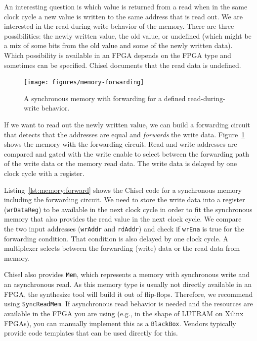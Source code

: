 \documentclass[%
    10pt,
    headinclude, footexclude,
    openright, %
    notitlepage,
    cleardoubleempty,
    headsepline,
    pointlessnumbers,
    bibtotoc, idxtotoc,
    ]{scrbook}
\newcommand{\code}[1]{{\lstinline[basicstyle=\small\ttfamily]{#1}}}
\begin{document}
An interesting question is which value is returned from a read when in the same clock
cycle a new value is written to the same address that is read out.
We are interested in the read-during-write behavior of the memory.
There are three possibilities: the newly written value, the old value, or undefined
(which might be a mix of some bits from the old value and some of the newly written data).
Which possibility is available in an FPGA depends on the FPGA type and
sometimes can be specified.
Chisel documents that the read data is undefined.

\begin{figure}
  \centering
  \texttt{[image: figures/memory-forwarding]}
  \caption{A synchronous memory with forwarding for a defined read-during-write behavior.}
  \label{fig:memory:forwarding}
\end{figure}

If we want to read out the newly written value, we can build a forwarding
circuit that detects that the addresses are equal and \emph{forwards} the
write data. Figure~\ref{fig:memory:forwarding} shows the memory with
the forwarding circuit. Read and write addresses are compared and gated with
the write enable to select between the forwarding path of the write data or the
memory read data. The write data is delayed by one clock cycle with a register.

Listing~\ref{lst:memory:forward} shows the Chisel code for a synchronous memory
including the forwarding circuit. We need to store the write data into a register
(\code{wrDataReg}) to be available in the next clock cycle in order to fit
the synchronous memory that also provides the read value in the next clock
cycle.
We compare the two input addresses (\code{wrAddr} and \code{rdAddr})
and check if \code{wrEna} is true for the forwarding condition.
That condition is also delayed by one clock cycle.
A multiplexer selects between the forwarding (write) data or the read
data from memory.


Chisel also provides \code{Mem}, which represents a memory with synchronous
write and an asynchronous read. As this memory type is usually not directly available
in an FPGA, the synthesize tool will build it out of flip-flops.
Therefore, we recommend using \code{SyncReadMem}. If asynchronous read behavior is needed and
the resources are available in the FPGA you are using (e.g., in the shape of LUTRAM on Xilinx
FPGAs), you can manually implement this as a \code{BlackBox}. Vendors typically provide
code templates that can be used directly for this.
\end{document}
